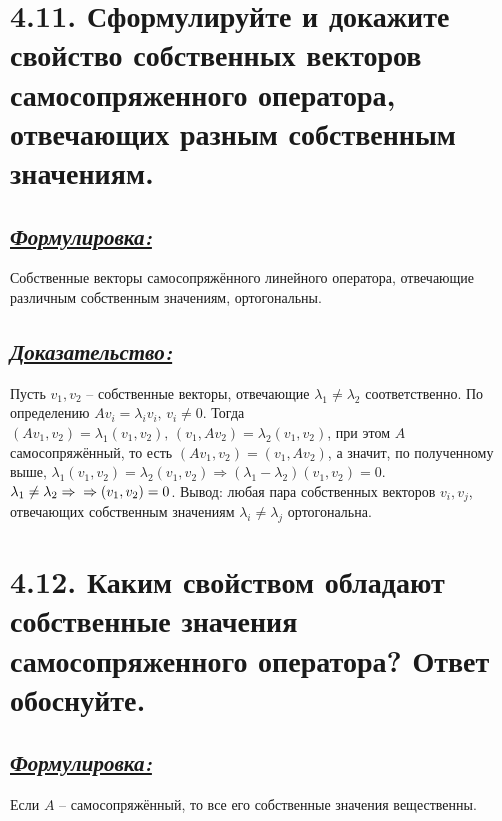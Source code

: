 \documentclass{article}
\begin{document}
\section*{\LARGE 4.11. Сформулируйте и докажите свойство собственных векторов самосопряженного оператора, отвечающих разным собственным значениям.  }
\subsection*{\Large \underline{\textit{Формулировка: }}}
Собственные векторы самосопряжённого линейного оператора, отвечающие различным собственным значениям, ортогональны.

\subsection*{\Large \underline{\textit{Доказательство: }}}
Пусть $v_1, v_2$ -- собственные векторы, отвечающие $\lambda_1 \ne \lambda_2$ соответственно. По определению $Av_i = \lambda_iv_i,\, v_i \ne 0$. Тогда $(Av_1, v_2) = \lambda_1(v_1, v_2),\, (v_1, Av_2) = \lambda_2(v_1, v_2)$, при этом $A$ самосопряжённый, то есть $(Av_1, v_2) = (v_1, Av_2)$, а значит, по полученному выше, $\lambda_1(v_1, v_2) = \lambda_2(v_1, v_2) \Rightarrow (\lambda_1 - \lambda_2)(v_1, v_2) = 0$. $\lambda_1 \ne \lambda_2 \Rightarrow \newline \Rightarrow (v_1, v_2) = 0$. Вывод: любая пара собственных векторов $v_i, v_j$, отвечающих собственным значениям $\lambda_i \ne \lambda_j$ ортогональна.

\section*{\LARGE 4.12. Каким свойством обладают собственные значения самосопряженного оператора? Ответ обоснуйте. }
\subsection*{\Large \underline{\textit{Формулировка: }}}
Если $A$ -- самосопряжённый, то все его собственные значения вещественны.
\end{document}
